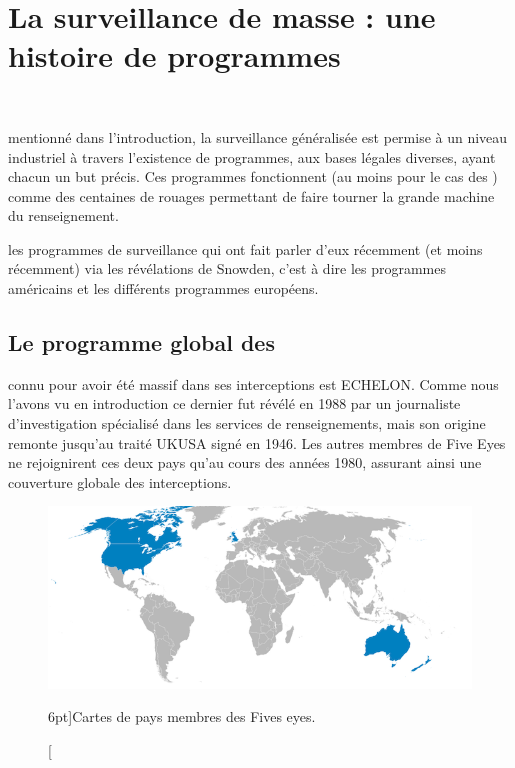 
\chapter{La surveillance de masse : une histoire de programmes}
\label{ch:programmes}

~\vfill
\begin{doublespace}
\noindent\fontsize{18}{22}\selectfont\itshape
\nohyphenation
{}
\end{doublespace}
\vfill
\vfill

 mentionné dans l'introduction, la surveillance
généralisée est permise à un niveau industriel à travers l'existence de
programmes, aux bases légales diverses, ayant chacun un but précis. Ces
programmes fonctionnent (au moins pour le cas des \EUA) comme des centaines de
rouages permettant de faire tourner la grande machine du renseignement.

 les programmes de surveillance qui ont fait
parler d'eux récemment (et moins récemment) via les révélations de Snowden, c'est à dire les
programmes américains et les différents programmes européens.


\section{Le programme global des
\EUA}

 connu pour avoir été massif dans ses
interceptions est ECHELON. Comme nous l'avons vu en introduction ce dernier fut
révélé en 1988 par un journaliste d'investigation spécialisé dans les services
de renseignements, mais son origine remonte jusqu'au traité UKUSA signé en 1946.
Les autres membres de Five Eyes ne rejoignirent ces deux pays qu'au cours des
années 1980, assurant ainsi une couverture globale des interceptions.

\begin{figure}
\includegraphics{fiveeyes.png}
\caption[Cartes de pays membres des Five Eyes][6pt]{Cartes de pays membres des
Fives eyes.}
\label{fig:carte}
\end{figure}

